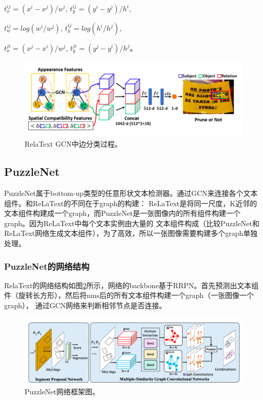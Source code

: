 $t_{x}^{ij} = (x^{i} - x^{j})/w^{i}$, $t_{y}^{ij} = (y^{i} - y^{j})/h^{i}$,

$t_{w}^{ij} = log(w^{i}/w^{j})$, $t_{h}^{ij} = log(h^{i}/h^{j})$,

$t_{x}^{ji} = (x^{j} - x^{i})/w^{j}$, $t_{y}^{ji} = (y^{j} - y^{i})/h^{j}$。




\begin{figure}[H]
    \centering
    \includegraphics[width=.8\textwidth]{figure/detection/relatext_graph.png} 
    \caption{RelaText GCN中边分类过程。} 
    \label{relatext_graph} 
\end{figure}

\subsection{PuzzleNet}
PuzzleNet\cite{liu2020puzzlenet}属于bottom-up类型的任意形状文本检测器。通过GCN来连接各个文本组件。和ReLaText的不同在于graph的构建：
ReLaText是将同一尺度，K近邻的文本组件构建成一个graph，而PuzzleNet是一张图像内的所有组件构建一个graph。因为ReLaText中每个文本实例由大量的
文本组件构成（比较PuzzleNet和ReLaText网络生成文本组件），为了高效，所以一张图像需要构建多个graph单独处理。

\subsubsection{PuzzleNet的网络结构}
RelaText的网络结构如图\ref{puzzlenet_framework}所示，网络的backbone基于RRPN。首先预测出文本组件（旋转长方形），然后将nms后的所有文本组件构建一个graph（一张图像一个graph），
通过GCN网络来判断相邻节点是否连接。
\begin{figure}[H]
    \centering
    \includegraphics[width=.98\textwidth]{figure/detection/puzzlenet_framework.png} 
    \caption{PuzzleNet网络框架图。} 
    \label{puzzlenet_framework} 
\end{figure}

